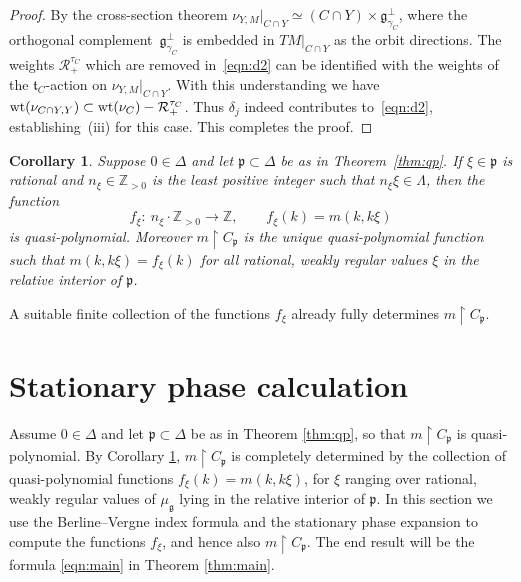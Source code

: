 \documentclass[pdftex]{sigma}
\numberwithin{equation}{section}
\newtheorem{Corollary}[Theorem]{Corollary}
\newcommand{\tn}[1]{\textnormal{#1}}
\def\g{\ensuremath{\mathfrak{g}}}
\def\t{\ensuremath{\mathfrak{t}}}
\def\p{\ensuremath{\mathfrak{p}}}
\def\R{\ensuremath{\mathcal{R}}}
\def\bZ{\ensuremath{\mathbb{Z}}}
\begin{document}
\begin{proof}
By the cross-section theorem $\nu_{Y,M}|_{C\cap Y}\simeq (C\cap Y)\times \g_{\gamma_C}^\perp$, where the orthogonal comple\-ment~$\g_{\gamma_C}^\perp$ is embedded in $TM|_{C\cap Y}$ as the orbit directions. The weights $\R_+^{\tau_C}$ which are removed in~\eqref{eqn:d2} can be identified with the weights of the $\t_C$-action on $\nu_{Y,M}|_{C\cap Y}$. With this understanding we have $\tn{wt}(\nu_{C\cap Y,Y})\subset \tn{wt}(\nu_C)-\R_+^{\tau_C}$. Thus $\delta_j$ indeed contributes to~\eqref{eqn:d2}, establishing~(iii) for this case. This completes the proof.
\end{proof}

\begin{Corollary}\label{cor:asymptoticdetermination}Suppose $0 \in \Delta$ and let $\p \subset \Delta$ be as in Theorem~{\rm \ref{thm:qp}}. If $\xi \in \p$ is rational and $n_\xi \in \bZ_{>0}$ is the least positive integer such that $n_\xi \xi \in \Lambda$, then the function
\[ f_\xi \colon \ n_\xi\cdot \bZ_{>0}\rightarrow \bZ, \qquad f_\xi(k)=m(k,k\xi) \]
is quasi-polynomial. Moreover $m\upharpoonright C_\p$ is the unique quasi-polynomial function such that $m(k,k\xi)\allowbreak =f_\xi(k)$ for all rational, weakly regular values $\xi$ in the relative interior of $\p$.
\end{Corollary}
\begin{Remark}A suitable finite collection of the functions $f_\xi$ already fully determines $m \upharpoonright C_\p$.
\end{Remark}

\section{Stationary phase calculation}\label{sec:statphase}
Assume $0 \in \Delta$ and let $\p \subset \Delta$ be as in Theorem \ref{thm:qp}, so that $m \upharpoonright C_\p$ is quasi-polynomial. By Corollary \ref{cor:asymptoticdetermination}, $m \upharpoonright C_\p$ is completely determined by the collection of quasi-polynomial functions $f_\xi(k)=m(k,k\xi)$, for $\xi$ ranging over rational, weakly regular values of $\mu_\g$ lying in the relative interior of $\p$. In this section we use the Berline--Vergne index formula and the stationary phase expansion to compute the functions $f_\xi$, and hence also $m \upharpoonright C_\p$. The end result will be the formula \eqref{eqn:main} in Theorem \ref{thm:main}.
\end{document}
